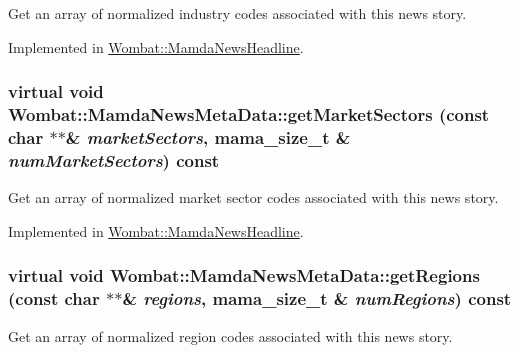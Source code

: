Get an array of normalized industry codes associated with this news story. 



Implemented in \hyperlink{classWombat_1_1MamdaNewsHeadline_6dd281e1212cf8a7efca3da2aec7d020}{Wombat::Mamda\-News\-Headline}.\hypertarget{classWombat_1_1MamdaNewsMetaData_f3882b3a14540a56a2a58d863755549d}{
\subsubsection[getMarketSectors]{\setlength{\rightskip}{0pt plus 5cm}virtual void Wombat::Mamda\-News\-Meta\-Data::get\-Market\-Sectors (const char $\ast$$\ast$\& {\em market\-Sectors}, mama\_\-size\_\-t \& {\em num\-Market\-Sectors}) const}}
\label{classWombat_1_1MamdaNewsMetaData_f3882b3a14540a56a2a58d863755549d}


Get an array of normalized market sector codes associated with this news story. 



Implemented in \hyperlink{classWombat_1_1MamdaNewsHeadline_c060c9e66c0fb02c4039f1ca5c14502c}{Wombat::Mamda\-News\-Headline}.\hypertarget{classWombat_1_1MamdaNewsMetaData_8eaa05007b92a32e985794c6b326b639}{
\subsubsection[getRegions]{\setlength{\rightskip}{0pt plus 5cm}virtual void Wombat::Mamda\-News\-Meta\-Data::get\-Regions (const char $\ast$$\ast$\& {\em regions}, mama\_\-size\_\-t \& {\em num\-Regions}) const}}
\label{classWombat_1_1MamdaNewsMetaData_8eaa05007b92a32e985794c6b326b639}


Get an array of normalized region codes associated with this news story. 



